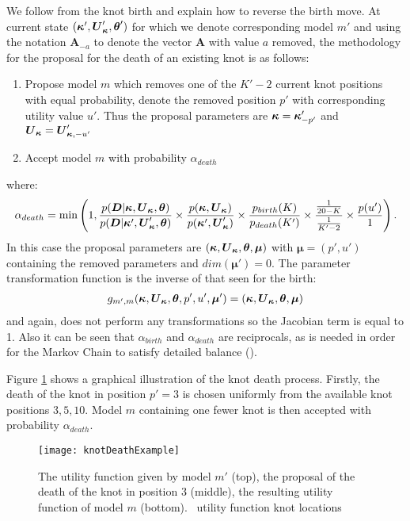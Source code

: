We follow from the knot birth and explain how to reverse the birth move. At current state \((\boldsymbol{\kappa}',
\boldsymbol{U}_{\boldsymbol{\kappa}}', \boldsymbol{\theta}')\) for which we denote corresponding model \(m'\) and using the notation
\(\boldsymbol{A}_{-a}\) to denote the vector \(\boldsymbol{A}\) with value \(a\) removed, the methodology for the
proposal for the death of an existing knot is as follows:
\begin{enumerate}
  \item Propose model \(m\) which removes one of the \(K' - 2\) current knot positions with equal
  probability, denote the removed position \(p'\) with corresponding utility value \(u'\). Thus the
  proposal parameters are \(\boldsymbol{\kappa} = \boldsymbol{\kappa}'_{-p'}\) and \(\boldsymbol{U}_{\boldsymbol{\kappa}} =
  \boldsymbol{U}_{\boldsymbol{\kappa},-u'}'\)
  \item Accept model \(m\) with probability \(\alpha_{death}\)
\end{enumerate}
where:
\begin{align} 
\alpha_{death} = \min\left(1, 
\frac{p(\boldsymbol{D} | \boldsymbol{\kappa}, \boldsymbol{U}_{\boldsymbol{\kappa}}, \boldsymbol{\theta})}
{p(\boldsymbol{D} | \boldsymbol{\kappa}', \boldsymbol{U}_{\boldsymbol{\kappa}}', \boldsymbol{\theta})} 
\times 
\frac{p(\boldsymbol{\kappa}, \boldsymbol{U}_{\boldsymbol{\kappa}})}
{p(\boldsymbol{\kappa}', \boldsymbol{U}_{\boldsymbol{\kappa}}')} 
\times
\frac{p_{birth}(K)}{p_{death}(K')} \times
\frac{\frac{1}{20 - K}}{\frac{1}{K' - 2}} \times
\frac{p(u')}{1}
\right).
\label{eq:death}
\end{align}
In this case the proposal parameters are \((\boldsymbol{\kappa}, \boldsymbol{U}_{\boldsymbol{\kappa}}, \boldsymbol{\theta}, \boldsymbol{\mu})\) with
\(\boldsymbol{\mu} = (p', u')\) containing the removed parameters and \(dim(\boldsymbol{\mu}') = 0\). The parameter
transformation function is the inverse of that seen for the birth:
\begin{align} 
g_{m', m}(\boldsymbol{\kappa}, \boldsymbol{U}_{\boldsymbol{\kappa}}, \boldsymbol{\theta}, p', u', \boldsymbol{\mu}') =
(\boldsymbol{\kappa}, \boldsymbol{U}_{\boldsymbol{\kappa}}, \boldsymbol{\theta}, \boldsymbol{\mu})
\end{align}
and again, does not perform any transformations so the Jacobian term is equal to 1. Also it can be seen that
\(\alpha_{birth}\) and \(\alpha_{death}\) are reciprocals, as is needed in order for the Markov Chain to satisfy
detailed balance (\cite{hastie2012}).

Figure \ref{fig:knotDeathExample} shows a graphical illustration of the knot death process. Firstly, the death of the
knot in position \(p' = 3\) is chosen uniformly from the available knot positions \(3, 5, 10\). Model \(m\) containing
one fewer knot is then accepted with probability \(\alpha_{death}\).
\begin{figure}[htp]
\begin{center}
  \texttt{[image: knotDeathExample]}
  \caption{\label{fig:knotDeathExample} The utility function given by model \(m'\) (top), the proposal of the death of
  the knot in position 3 (middle), the resulting utility function of model \(m\) (bottom). \protect\blackFilledCircle\
  utility function knot locations}
\end{center}
\end{figure}

